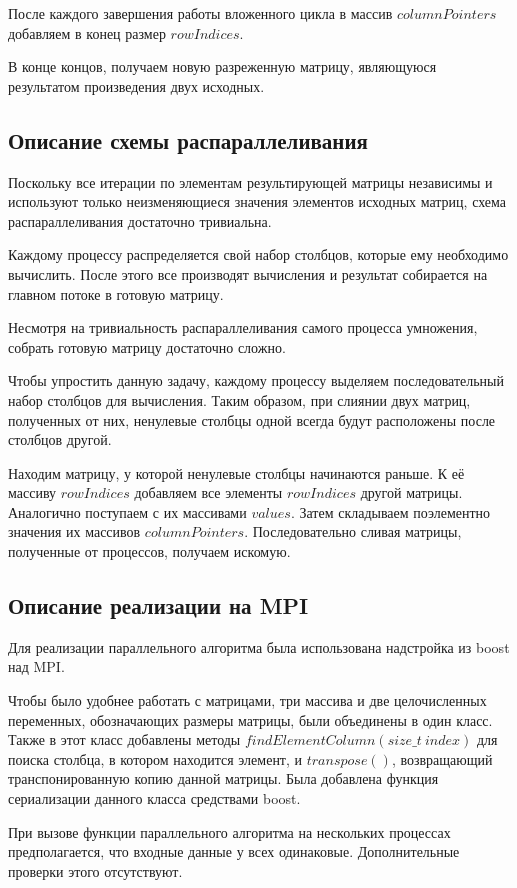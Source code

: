 \documentclass[a4paper,12pt]{article}
\begin{document}
После каждого завершения работы вложенного цикла в массив $columnPointers$ добавляем в конец размер $rowIndices$.

В конце концов, получаем новую разреженную матрицу, являющуюся результатом произведения двух исходных.

\subsection{Описание схемы распараллеливания}

Поскольку все итерации по элементам результирующей матрицы независимы и используют только неизменяющиеся значения элементов исходных матриц, схема распараллеливания достаточно тривиальна.

Каждому процессу распределяется свой набор столбцов, которые ему необходимо вычислить. После этого все производят вычисления и результат собирается на главном потоке в готовую матрицу.

Несмотря на тривиальность распараллеливания самого процесса умножения, собрать готовую матрицу достаточно сложно.

Чтобы упростить данную задачу, каждому процессу выделяем последовательный набор столбцов для вычисления. Таким образом, при слиянии двух матриц, полученных от них, ненулевые столбцы одной всегда будут расположены после столбцов другой.

Находим матрицу, у которой ненулевые столбцы начинаются раньше. К её массиву $rowIndices$ добавляем все элементы $rowIndices$ другой матрицы. Аналогично поступаем с их массивами $values$. Затем складываем поэлементно значения их массивов $columnPointers$. Последовательно сливая матрицы, полученные от процессов, получаем искомую.

\subsection{Описание реализации на MPI}
Для реализации параллельного алгоритма была использована надстройка из boost над MPI.

Чтобы было удобнее работать с матрицами, три массива и две целочисленных переменных, обозначающих размеры матрицы, были объединены в один класс. Также в этот класс добавлены методы $findElementColumn(size\_t\ index)$ для поиска столбца, в котором находится элемент, и $transpose()$, возвращающий транспонированную копию данной матрицы. Была добавлена функция сериализации данного класса средствами boost.

При вызове функции параллельного алгоритма на нескольких процессах предполагается, что входные данные у всех одинаковые. Дополнительные проверки этого отсутствуют.
\end{document}
